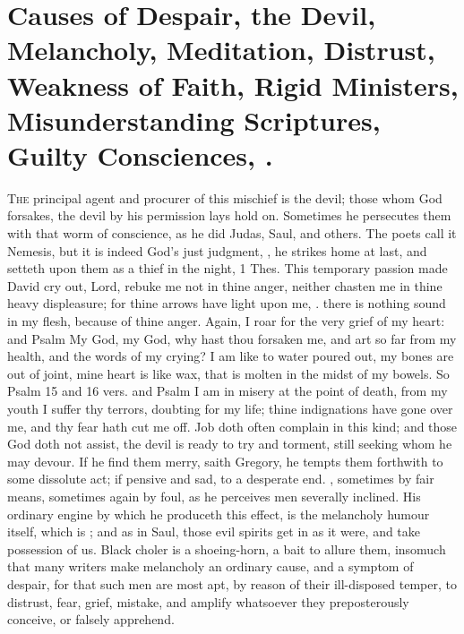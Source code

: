 {\section[Causes of Despair]{Causes of Despair, the Devil, Melancholy, Meditation, Distrust, Weakness of Faith, Rigid Ministers, Misunderstanding Scriptures, Guilty Consciences, \etc{}.}
\lettrine{T}{he} principal agent and procurer of this mischief is the devil; those
whom God forsakes, the devil by his permission lays hold on. Sometimes
he persecutes them with that worm of conscience, as he did Judas,
Saul, and others. The poets call it Nemesis, but it is indeed
God's just judgment, , he strikes home at last, and
setteth upon them as a thief in the night, 1 Thes.  This
temporary passion made David cry out, Lord, rebuke me not in thine
anger, neither chasten me in thine heavy displeasure; for thine arrows
have light upon me, \etc{}. there is nothing sound in my flesh, because of
thine anger. Again, I roar for the very grief of my heart: and Psalm
 My God, my God, why hast thou forsaken me, and art so far from my
health, and the words of my crying? I am like to water poured out, my
bones are out of joint, mine heart is like wax, that is molten in the
midst of my bowels. So Psalm  15 and 16 vers. and Psalm  I
am in misery at the point of death, from my youth I suffer thy terrors,
doubting for my life; thine indignations have gone over me, and thy
fear hath cut me off. Job doth often complain in this kind; and those
God doth not assist, the devil is ready to try and torment, still
seeking whom he may devour. If he find them merry, saith Gregory, he
tempts them forthwith to some dissolute act; if pensive and sad, to a
desperate end. , sometimes by
fair means, sometimes again by foul, as he perceives men severally
inclined. His ordinary engine by which he produceth this effect, is the
melancholy humour itself, which is ;
and as in Saul, those evil spirits get in as it were, and take
possession of us. Black choler is a shoeing-horn, a bait to allure
them, insomuch that many writers make melancholy an ordinary cause, and
a symptom of despair, for that such men are most apt, by reason of
their ill-disposed temper, to distrust, fear, grief, mistake, and
amplify whatsoever they preposterously conceive, or falsely apprehend.

}
